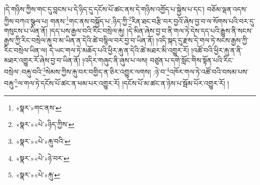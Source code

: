 །དེ་གཉིས་ཀྱིས་གང་དུ་བླངས་པ་དེ་ཉིད་དུ་དངོས་པོ་ཚང་ནས་དེ་གཉིས་འགྱོད་པ་སྐྱེས་པ་དང་། བཅོམ་ལྡན་འདས་ཀྱིས་བཀའ་སྩལ་པ། གནས་\footnote{«སྣར་»གང་ནས་}གང་ནས་བསྐྱོད་པ་:ཉིད་ཀྱི་\footnote{«སྣར་»«པེ་»ཉིད་ཀྱིས་}རིན་ཐང་བརྩི་བར་བྱའོ་ཞེས་བྱ་བ་ལ་སོགས་པའི་བར་དུ་གསུངས་པ་ཡིན་ནོ། །དད་པས་རྒྱལ་བའི་རིང་བསྲེལ་རྐུ། །དེ་མིན་ཞེས་བྱ་བ་ནི་གལ་ཏེ་དེས་དད་པའི་རྒྱུས་ནི་སངས་རྒྱས་ཀྱི་རིང་བསྲེལ་རྐུ་བ་མ་ཡིན་ན་དེའི་ཚེ་བསྙིལ་བར་བྱ་བ་ཡིན་ནོ། །འདི་སྐད་དུ་རྫས་དེ་གལ་ཏེ་སངས་རྒྱས་ཀྱི་རིང་བསྲེལ་ཡིན་ལ། དེ་ཡང་གལ་ཏེ་མཆོད་པའི་ཕྱིར་རྐུ་ན་དེའི་ཚེ་མཐར་མི་འགྱུར་རོ། །འཚོ་བའི་ཕྱིར་རྐུ་ན་ནི་མཐར་འགྱུར་རོ་ཞེས་བྱ་བ་ཡིན་ནོ། །འདིར་གཞུང་ནི་ཞུས་པ་ལས། བཙུན་པ་དགེ་སློང་གིས་སྟོན་པའི་རིང་བསྲེལ་:བརྐུ་བའི་\footnote{«སྣར་»«པེ་»རྐུ་བའི་}སེམས་ཀྱིས་རྐུ་བར་བགྱིད་ན་ཅིར་འགྱུར་ལགས། :ཉེ་བ་\footnote{«སྣར་»«པེ་»ཉེ་བར་}འཁོར་གལ་ཏེ་འཚོ་བའི་བསམ་པས་བརྐུ་\footnote{«སྣར་»«པེ་»རྐུ་}ལ་གལ་ཏེ་དངོས་པོ་ཚང་ན་ཕམ་པར་འགྱུར་རོ། །དངོས་པོ་མ་ཚང་ན་ཉེས་པ་སྦོམ་པོར་འགྱུར་རོ། །
